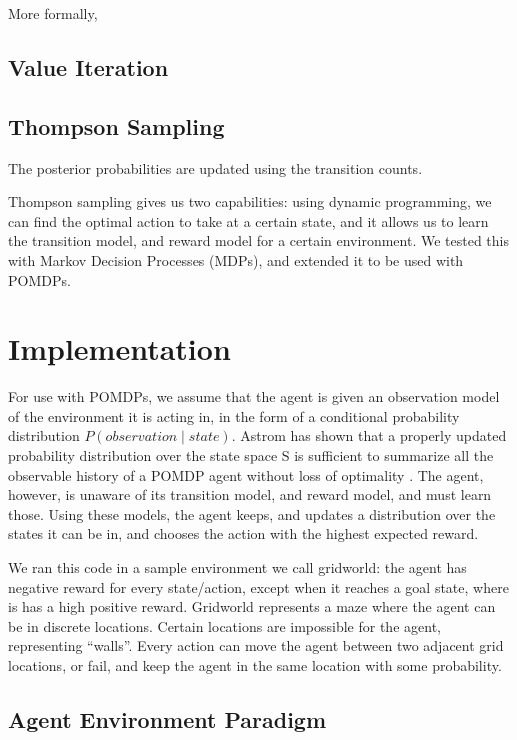 \documentclass{pset}
\begin{document}
More formally, 


\subsection{Value Iteration}

\subsection{Thompson Sampling}

The posterior probabilities are updated using the transition counts.

Thompson sampling gives us two capabilities: using dynamic programming, we can
find the optimal action to take at a certain state, and it allows us to learn
the transition model, and reward model for a certain environment. We tested this
with Markov Decision Processes (MDPs), and extended it to be used with POMDPs.

\section{Implementation}
For use with POMDPs, we assume that the agent is given an observation model of the
environment it is acting in, in the form of a conditional probability distribution
$P(observation \mid state)$. Astrom has shown that a properly updated probability 
distribution over the state space S is sufficient to summarize all the observable 
history of a POMDP agent without loss of optimality \cite{astrom}. The agent, however, is unaware of its transition model, and
reward model, and must learn those. Using these models, the agent keeps, and
updates a distribution over the states it can be in, and chooses the action with
the highest expected reward.

We ran this code in a sample environment we call gridworld: the agent has negative
reward for every state/action, except when it reaches a goal state, where is has
a high positive reward.
Gridworld represents a maze where the agent can be in discrete locations. Certain
locations are impossible for the agent, representing ``walls''. Every action can
move the agent between two adjacent grid locations, or fail, and keep the agent in
the same location with some probability.

\subsection{Agent Environment Paradigm}
\end{document}
